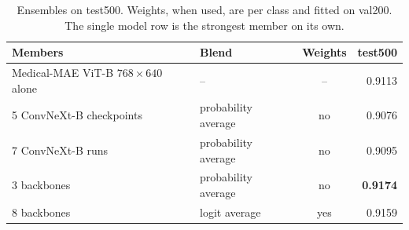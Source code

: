 
\begin{table}[H]
  \caption{Ensembles on test500. Weights, when used, are per class and fitted on
  val200. The single model row is the strongest member on its own.}
  \centering
  \footnotesize
  \begin{tabular}{llcr}
    \toprule
    Members & Blend & Weights & test500 \\
    \midrule
    Medical-MAE ViT-B $768\times640$ alone & -- & -- & 0.9113 \\
    \midrule
    5 ConvNeXt-B checkpoints & probability average & no & 0.9076 \\
    7 ConvNeXt-B runs & probability average & no & 0.9095 \\
    \midrule
    3 backbones & probability average & no & \textbf{0.9174} \\
    8 backbones & logit average & yes & 0.9159 \\
    \bottomrule
  \end{tabular}
  \label{tab:ens}
\end{table}
